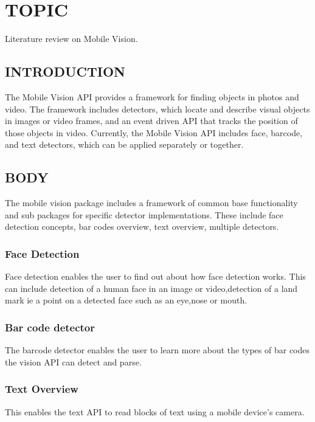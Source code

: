\documentclass[10pt]{article}
\begin{document}
  \section{TOPIC}
Literature review on Mobile Vision.

    \subsection{INTRODUCTION}
\cite{key:one}The Mobile Vision API provides a framework for finding objects in photos and video. The framework includes detectors, which locate and describe visual objects in images or video frames, and an event driven API that tracks the position of those objects in video.
Currently, the Mobile Vision API includes face, barcode, and text detectors, which can be applied separately or together.
 \subsection{BODY}
The mobile vision package includes a framework of common base functionality and sub packages for specific detector implementations.
These include face detection concepts, bar codes overview, text overview, multiple detectors.\cite{key:two}
\subsubsection{Face Detection}
Face detection enables the user to find out about how face detection works.
This can include detection of a human face in an image or video,detection of a land mark ie a point on a detected face such as an eye,nose or mouth.\cite{key:three}
\subsubsection{Bar code detector}
The barcode detector enables the user to learn more about the types of bar codes the vision API can detect and parse.\cite{key:four}
\subsubsection{Text Overview}
This enables the text API to read blocks of text using a mobile device's camera.
\newpage

 
\end{document}
